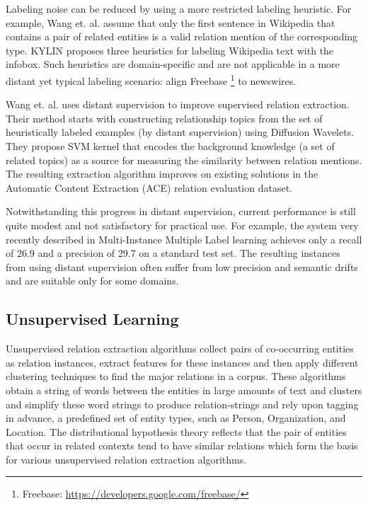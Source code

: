Labeling noise can be reduced by using a more restricted labeling heuristic. For example, Wang et. al. \cite{wang2011relation} assume that only the first sentence in Wikipedia that contains a pair of related entities is a valid relation mention of the corresponding type. KYLIN \cite{wu2007autonomously} proposes three heuristics for labeling Wikipedia text with the infobox. Such heuristics are domain-specific and are not applicable in a more distant yet typical labeling scenario: align Freebase \footnote{Freebase: \url{https://developers.google.com/freebase/}} to newswires. 

Wang et. al. \cite{wang2011relation} uses distant supervision to improve supervised relation extraction. Their method starts with constructing relationship topics from the set of heuristically labeled examples (by distant supervision) using Diffusion Wavelets. They propose SVM kernel that encodes the background knowledge (a set of related topics) as a source for measuring the similarity between relation mentions. The resulting extraction algorithm improves on existing solutions in the Automatic Content Extraction (ACE) relation evaluation dataset.

Notwithstanding this progress in distant supervision, current performance is still quite modest and not satisfactory for practical use. For example, the system very recently described in Multi-Instance Multiple Label \cite{surdeanu2012multi} learning achieves only a recall of 26.9 and a precision of 29.7 on a standard test set. The resulting instances from using distant supervision often suffer from low precision and semantic drifts and are suitable only for some domains.

\subsection{Unsupervised Learning}
\label{subsection:unsupervised-learning}
Unsupervised relation extraction algorithms collect pairs of co-occurring entities as relation instances, extract features for these instances and then apply different clustering techniques to find the major relations in a corpus. These algorithms obtain a string of words between the entities in large amounts of text and clusters and simplify these word strings to produce relation-strings and rely upon tagging in advance, a predefined set of entity types, such as Person, Organization, and Location. The distributional hypothesis theory \cite{harris1954distributional} reflects that the pair of entities that occur in related contexts tend to have similar relations which form the basis for various unsupervised relation extraction algorithms.  


